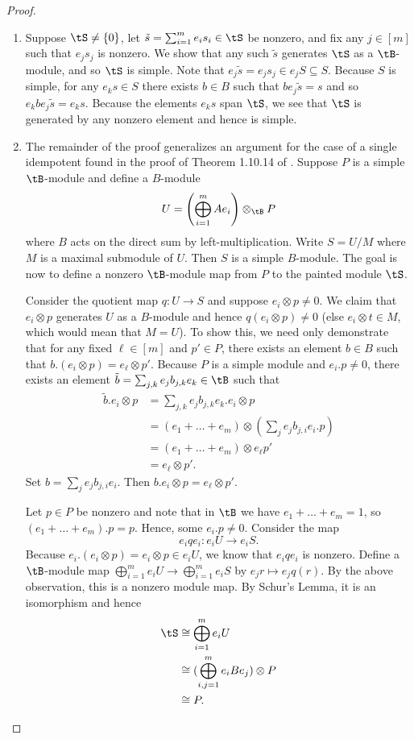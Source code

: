 \begin{proof} \phantom{a}
    \begin{enumerate}
        \item Suppose $\tS\neq\{0\}$, let $\tilde{s}=\sum_{i=1}^m e_is_i\in\tS$ be nonzero, and fix any $j\in[m]$ such that $e_js_j$ is nonzero. We show that any such $\tilde{s}$ generates $\tS$ as a $\tB$-module, and so $\tS$ is simple. Note that $e_j\tilde{s}=e_js_j\in e_j S\subseteq S$. Because $S$ is simple, for any $e_ks\in S$ there exists $b\in B$ such that $be_j\tilde{s}=s$ and so $e_kb e_j\tilde{s}=e_k s$. Because the elements $e_k s$ span $\tS$, we see that $\tS$ is generated by any nonzero element and hence is simple.

        \item The remainder of the proof generalizes an argument for the case of a single idempotent found in the proof of Theorem 1.10.14 of \cite{linckelmann_2018}. Suppose $P$ is a simple $\tB$-module and define a $B$-module \[U=\left(\bigoplus_{i=1}^m Ae_i\right)\otimes_{\tB}P\] where $B$ acts on the direct sum by left-multiplication. Write $S=U/M$ where $M$ is a maximal submodule of $U$. Then $S$ is a simple $B$-module. The goal is now to define a nonzero $\tB$-module map from $P$ to the painted module $\tS$.

    Consider the quotient map $q:U\to S$ and suppose $e_i\otimes p\neq0$. We claim that $e_i\otimes p$ generates $U$ as a $B$-module and hence $q(e_i\otimes p)\neq0$ (else $e_i\otimes t\in M$, which would mean that $M=U$). To show this, we need only demonstrate that for any fixed $\ell\in[m]$ and $p'\in P$, there exists an element $b\in B$ such that $b.(e_i\otimes p)=e_\ell\otimes p'$. Because $P$ is a simple module and $e_i.p\neq0$, there exists an element  $\tilde{b}=\sum_{j,k}e_jb_{j,k}e_k\in \tB$ such that \begin{align*}
        \tilde{b}.e_i\otimes p&=\sum_{j,k}e_jb_{j,k}e_k.e_i\otimes p\\
        &=(e_1+\dots+e_m)\otimes (\sum_{j}e_jb_{j,i}e_i.p)\\
        &=(e_1+\dots+e_m)\otimes e_\ell p'\\
        &=e_\ell\otimes p'.
    \end{align*} Set $b=\sum_{j}e_jb_{j,i}e_i$. Then $b.e_i\otimes p=e_\ell\otimes p'$.

    Let $p\in P$ be nonzero and note that in $\tB$ we have $e_1+\dots+e_m=1$, so $(e_1+\dots+e_m).p=p$. Hence, some $e_i.p\neq0$. Consider the map \[e_i q e_i:e_iU\to e_i S.\] Because $e_i.(e_i\otimes p)=e_i\otimes p \in e_i U$, we know that $e_i q e_i$ is nonzero.  Define a $\tB$-module map $\bigoplus_{i=1}^m e_iU\to\bigoplus_{i=1}^m e_iS$ by $e_jr\mapsto e_j q(r)$. By the above observation, this is a nonzero module map. By Schur's Lemma, it is an isomorphism and hence \begin{align*}
        \tS&\cong \bigoplus_{i=1}^m e_iU\\
        &\cong(\bigoplus_{i,j=1}^m e_iBe_j)\otimes P\\
        &\cong P. \qedhere
    \end{align*}
    \end{enumerate}
\end{proof}


